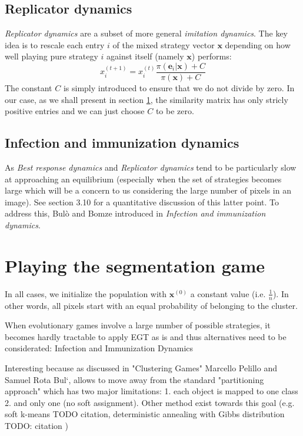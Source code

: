 \documentclass[11pt,a4paper]{article}
\begin{document}
\subsection*{Replicator dynamics}
\textit{Replicator dynamics} are a subset of more general \textit{imitation dynamics}. The key idea is to rescale each entry $i$ of the mixed strategy vector $\mathbf{x}$ depending on how well playing pure strategy $i$ against itself (namely $\mathbf{x}$) performs:
\begin{equation}
    x_i^{(t+1)} = x_i^{(t)}\frac{\pi(\mathbf{e}_i|\mathbf{x}) + C}{\pi(\mathbf{x}) + C}
\end{equation}
The constant $C$ is simply introduced to ensure that we do not divide by zero. In our case, as we shall present in section \ref{sec:seg-game}, the similarity matrix has only stricly positive entries and we can just choose $C$ to be zero.

\subsection*{Infection and immunization dynamics}
As \textit{Best response dynamics} and \textit{Replicator dynamics} tend to be particularly slow at approaching an equilibrium (especially when the set of strategies becomes large which will be a concern to us considering the large number of pixels in an image). See section 3.10 \cite{bulo-thesis} for a quantitative discussion of this latter point. To address this, Bulò and Bomze introduced in \cite{inimdyn} \textit{Infection and immunization dynamics}.

\section{Playing the segmentation game}
\label{sec:seg-game}

In all cases, we initialize the population with $\mathbf{x}^{(0)}$ a constant value (i.e. $\frac{1}{n}$). In other words, all pixels start with an equal probability of belonging to the cluster.

When evolutionary games involve a large number of possible strategies, it becomes hardly tractable to apply EGT as is and thus alternatives need to be considerated: Infection and Immunization Dynamics    

Interesting because as discussed in "Clustering Games" Marcello Pelillo and Samuel Rota Bul`, allows to move away from the standard "partitioning approach" which has two major limitations: 1. each object is mapped to one class 2. and only one (no soft assignment). Other method exist towards this goal (e.g. soft k-means TODO citation, deterministic annealing with Gibbs distribution TODO: citation )
\end{document}
